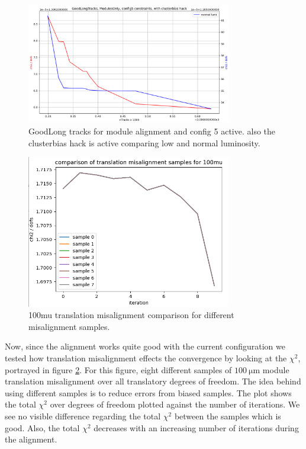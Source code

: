 \begin{figure}
  \centering
  \includegraphics[width=0.8\textwidth]{plots/feb_2_2022/GL_modules_c5_cb_hackactive_low_normal_lumi.png}
  \caption{GoodLong tracks for module alignment and config 5 active. also the clusterbias hack is active comparing low and normal luminosity.}
  \label{fig:GL_lumi_low_normal_hack_on}
\end{figure}

\begin{figure}
  \centering
  \includegraphics[width=0.8\textwidth]{plots/feb_6_2022/100mu_misalignment_samples_compared.png}
  \caption{100mu translation misalignment comparison for different misalignment samples.}
  \label{fig:100muT}
\end{figure}

Now, since the alignment works quite good with the current configuration we
tested how translation misalignment effects the convergence by looking at the
$\chi^2$, portrayed in figure \ref{fig:100muT}. For this figure, eight different samples of $\SI{100}{\micro\metre}$ module translation misalignment over all translatory
degrees of freedom. The idea behind using different samples is to reduce errors
from biased samples. The plot shows the total $\chi^2$ over degrees of freedom
plotted against the number of iterations. We see no visible difference regarding
the total $\chi^2$ between the samples which is good.
Also, the total $\chi^2$ decreases with an increasing number of iterations
during the alignment.

